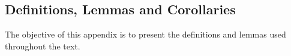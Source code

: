 \documentclass[../thesis.tex]{subfiles}
\begin{document}
\newpage

\subsection{Definitions, Lemmas and Corollaries}

The objective of this appendix is to present the definitions and lemmas used throughout the text.

\begin{comment}

\subsubsection*{Household}

	
	\begin{definition}[Household Maximization Problem]
		{\singlespacing
			The utility function is:
			\begin{itemize}
				\item strictly increasing in consumption $C$;
				\item strictly increasing in leisure $l$;
				\item strictly concave;
				\item twice continuously differentiable;
				\item the composite consumption good $C$ is also the numeraire good, so that its price equals one: $p_C=1$;
				\item to avoid corner solutions, the Inada conditions\footnotemark{} hold. \footnotetext{see definition \ref{def:Inada Condition}.}
		\end{itemize}}
		
		Consider a representative household that maximizes an utility function $u$ that depends on consumption $C_t$ and labor $L_t$:
		\begin{align}
			u \equiv u \left( C_t, L_t \right)
		\end{align}
		
		The utility function is considered to be convex (when a variable increases, the respective marginal utility diminishes)\footnotemark{}: \footnotetext{Consider the following notation: given two variables $X$ and $Y$, the first and second partial derivatives are: $Y_X := \displaystyle\frac{\partial Y}{\partial X}$ and $Y_{XX} := \displaystyle\frac{\partial^2 Y}{\partial X^2}$.}
		\begin{align*}
			u_{C} > 0 \text{,}\quad u_{CC} < 0 \text{,}\quad
			u_{L} > 0 \text{,}\quad u_{LL} < 0
		\end{align*}
		

\end{comment}
\end{document}
